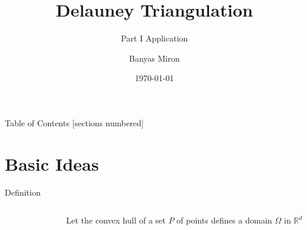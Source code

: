 \documentclass[10pt]{beamer}
\title{Delauney Triangulation}
\subtitle{Part I Application}
\date{\today}
\author{Banyas Miron}
\institute{Kyiv Algorithms Club}
\begin{document}
\maketitle

\begin{frame}{Table of Contents}
  [sections numbered]
  \tableofcontents[hideallsubsections]
\end{frame}

\section{Basic Ideas}

\begin{frame}{Definition}
\begin{columns}
	\begin{column}{0.3\textwidth} 
		\begin{figure}[h]
		\end{figure}
	\end{column}
	\begin{column}{0.7\textwidth} 
		Let the convex hull of a set $P$ of points defines a domain $\Omega$ in $\mathbb{R}^d$ 
		\bigskip
		

\end{column}
\end{columns}
\end{frame}
\end{document}
